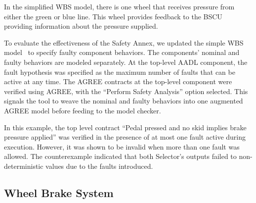 In the simplified WBS model, there is one wheel that receives pressure from either the green or blue line. This wheel provides feedback to the BSCU providing information about the pressure supplied.

To evaluate the effectiveness of the Safety Annex, we updated the simple WBS model~\cite{Stewart17:IMBSA} to specify faulty component behaviors. The components' nominal  and faulty behaviors are modeled separately. At the top-level AADL component, the fault hypothesis was specified as the maximum number of faults that can be active at any time. The AGREE contracts at the top-level component were verified using AGREE, with the ``Perform Safety Analysis'' option selected. This signals the tool to weave the nominal and faulty behaviors into one augmented AGREE model before feeding to the model checker.

In this example, the top level contract ``Pedal pressed and no skid implies brake pressure applied'' was verified in the presence of at most one fault active during execution.  However, it was shown to be invalid when more than one fault was allowed. The counterexample indicated that both Selector's outputs failed to non-deterministic values due to the faults introduced.
\fi


\subsection{Wheel Brake System}

